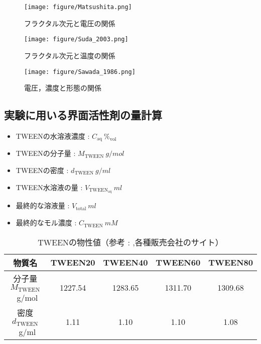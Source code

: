 \documentclass{ltjsarticle}
\begin{document}
\begin{figure}[H]
  \begin{minipage}{0.3\columnwidth}
    \centering
    \texttt{[image: figure/Matsushita.png]}
    \caption{フラクタル次元と電圧の関係\cite{matsushita1984fractal}}
    \label{fig:電圧とフラクタル次元}
  \end{minipage}
  \begin{minipage}{0.3\columnwidth}
    \centering
    \texttt{[image: figure/Suda\_2003.png]}
    \caption{フラクタル次元と温度の関係\cite{suda2003temperature}}
    \label{fig:温度とフラクタル次元}
  \end{minipage}
  \begin{minipage}{0.3\columnwidth}
    \centering
    \texttt{[image: figure/Sawada\_1986.png]}
    \caption{電圧，濃度と形態の関係\cite{sawada1986dendritic}}
    \label{fig:電圧，濃度と形態}
  \end{minipage}
\end{figure}

\subsection{実験に用いる界面活性剤の量計算}
\begin{itemize}
  \item TWEENの水溶液濃度 : $C_{\mathrm{aq}} \ \%_{\mathrm{vol}}$
  \item TWEENの分子量 : $M_{\mathrm{TWEEN}} \ \si{g/mol}$
  \item TWEENの密度 : $d_{\mathrm{TWEEN}} \ \si{g/ml}$
  \item TWEEN水溶液の量 : $V_{\mathrm{TWEEN_{aq}}} \ \si{ml}$
  \item 最終的な溶液量 : $V_{\mathrm{total}} \ \si{ml}$
  \item 最終的なモル濃度 : $C_{\mathrm{TWEEN}} \ \si{mM}$
\end{itemize}
\begin{table}[H]
  \centering
  \caption{TWEENの物性値（参考 : \cite{hait2001determination},各種販売会社のサイト）}
  \begin{tabular}{|c||c|c|c|c|}
    \hline
    物質名                                  & TWEEN20 & TWEEN40 & TWEEN60 & TWEEN80 \\
    \hline \hline
    分子量 $M_{\mathrm{TWEEN}}$\ \si{g/mol} & 1227.54 & 1283.65 & 1311.70 & 1309.68 \\
    \hline 
    密度 $d_{\mathrm{TWEEN}}$\ \si{g/ml}    & 1.11    & 1.10    & 1.10    & 1.08    \\
    \hline
  \end{tabular}
\end{table}
\end{document}
